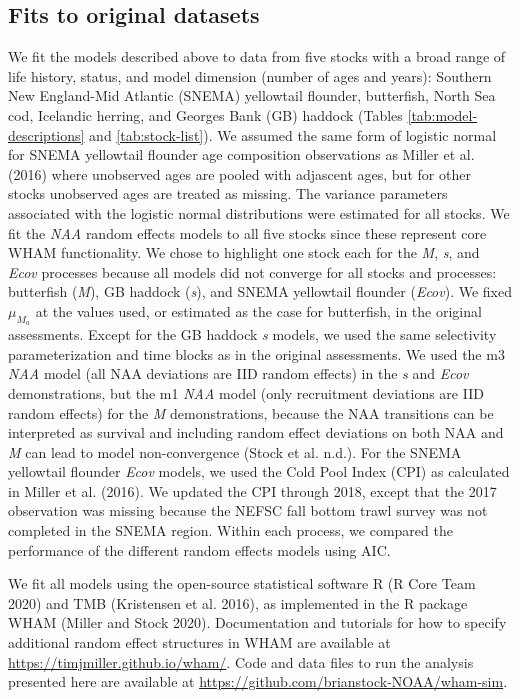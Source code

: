 \documentclass[]{article}
\begin{document}
\hypertarget{fits-to-original-datasets}{%
\subsection{Fits to original datasets}\label{fits-to-original-datasets}}

We fit the models described above to data from five stocks with a broad
range of life history, status, and model dimension (number of ages and
years): Southern New England-Mid Atlantic (SNEMA) yellowtail flounder,
butterfish, North Sea cod, Icelandic herring, and Georges Bank (GB)
haddock (Tables \ref{tab:model-descriptions} and \ref{tab:stock-list}).
We assumed the same form of logistic normal for SNEMA yellowtail
flounder age composition observations as Miller et al. (2016) where
unobserved ages are pooled with adjascent ages, but for other stocks
unobserved ages are treated as missing. The variance parameters
associated with the logistic normal distributions were estimated for all
stocks. We fit the \emph{NAA} random effects models to all five stocks
since these represent core WHAM functionality. We chose to highlight one
stock each for the \emph{M}, \emph{s}, and \emph{Ecov} processes because
all models did not converge for all stocks and processes: butterfish
(\emph{M}), GB haddock (\emph{s}), and SNEMA yellowtail flounder
(\emph{Ecov}). We fixed \(\mu_{M_a}\) at the values used, or estimated
as the case for butterfish, in the original assessments. Except for the
GB haddock \emph{s} models, we used the same selectivity
parameterization and time blocks as in the original assessments. We used
the m3 \emph{NAA} model (all NAA deviations are IID random effects) in
the \emph{s} and \emph{Ecov} demonstrations, but the m1 \emph{NAA} model
(only recruitment deviations are IID random effects) for the \emph{M}
demonstrations, because the NAA transitions can be interpreted as
survival and including random effect deviations on both NAA and \emph{M}
can lead to model non-convergence (Stock et al. n.d.). For the SNEMA
yellowtail flounder \emph{Ecov} models, we used the Cold Pool Index
(CPI) as calculated in Miller et al. (2016). We updated the CPI through
2018, except that the 2017 observation was missing because the NEFSC
fall bottom trawl survey was not completed in the SNEMA region. Within
each process, we compared the performance of the different random
effects models using AIC.

We fit all models using the open-source statistical software R (R Core
Team 2020) and TMB (Kristensen et al. 2016), as implemented in the R
package WHAM (Miller and Stock 2020). Documentation and tutorials for
how to specify additional random effect structures in WHAM are available
at \url{https://timjmiller.github.io/wham/}. Code and data files to run
the analysis presented here are available at
\url{https://github.com/brianstock-NOAA/wham-sim}.
\end{document}
